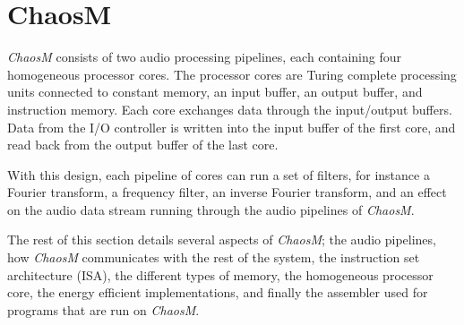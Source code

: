 
\FloatBarrier
\section{ChaosM}\label{chapter:fpga}

\textit{ChaosM} consists of two audio processing pipelines, each containing four
homogeneous processor cores. The processor cores are Turing complete processing
units connected to constant memory, an input buffer, an output buffer, and
instruction memory. Each core exchanges data through the input/output buffers.
Data from the I/O controller is written into the input buffer of the first core,
and read back from the output buffer of the last core.

With this design, each pipeline of cores can run a set of filters, for instance
a Fourier transform, a frequency filter, an inverse Fourier transform, and an
effect on the audio data stream running through the audio pipelines of
\textit{ChaosM}.

The rest of this section details several aspects of \textit{ChaosM}; the audio
pipelines, how \textit{ChaosM} communicates with the rest of the system, the
instruction set architecture (ISA), the different types of memory, the homogeneous
processor core, the energy efficient implementations, and finally the assembler
used for programs that are run on \textit{ChaosM}.








